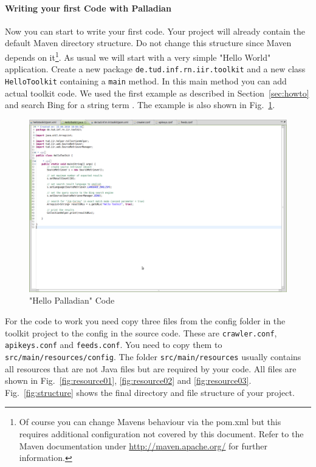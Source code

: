 \documentclass[a4paper,twoside]{book}      %
\begin{document}
\paragraph{Writing your first Code with Palladian} Now you can start to write your first code. Your project will already contain the default Maven directory structure. Do not change this structure since Maven depends on it\footnote{Of course you can change Mavens behaviour via the pom.xml but this requires additional configuration not covered by this document. Refer to the Maven documentation under \url{http://maven.apache.org/} for further information.}. As usual we will start with a very simple "Hello World" application. Create a new package \texttt{de.tud.inf.rn.iir.toolkit} and a new class \texttt{HelloToolkit} containing a \texttt{main} method. In this main method you can add actual toolkit code. We used the first example as described in Section~\ref{sec:howto} and search Bing for a string term . The example is also shown in Fig.~\ref{fig:hellotoolkit}.
\begin{figure}
\centering
\includegraphics[trim=0 350px 600px 0,clip=true,width=\textwidth]{img/ht10.png}
\caption{"Hello Palladian" Code}
\label{fig:hellotoolkit}
\end{figure}
For the code to work you need copy three files from the config folder in the toolkit project to the config in the source code. These are \texttt{crawler.conf}, \texttt{apikeys.conf} and \texttt{feeds.conf}. You need to copy them to \texttt{src/main/resources/config}. The folder \texttt{src/main/resources} usually contains all resources that are not Java files but are required by your code. All files are shown in Fig.~\ref{fig:resource01}, \ref{fig:resource02} and \ref{fig:resource03}. Fig.~\ref{fig:structure} shows the final directory and file structure of your project.
\end{document}
